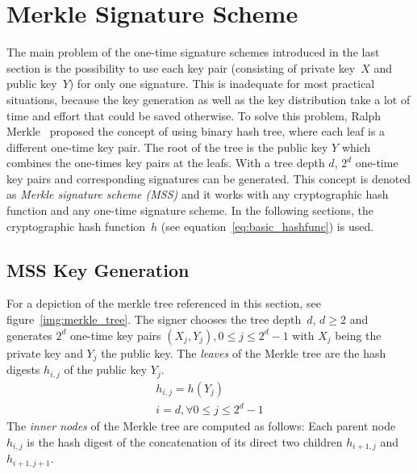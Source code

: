 \section{Merkle Signature Scheme} %
The main problem of the one-time signature schemes introduced in the last section is the possibility to use each key pair (consisting of private key~$X$ and public key~$Y$) for only one signature. This is inadequate for most practical situations, because the key generation as well as the key distribution take a lot of time and effort that could be saved otherwise.
To solve this problem, Ralph Merkle~\cite{cha:bg_merkletrees_Merkle_1979} proposed the concept of using binary hash tree, where each leaf is a different one-time key pair. The root of the tree is the public key $Y$  which combines the one-times key pairs at the leafs. With a tree depth $d$, $2^d$ one-time key pairs and corresponding signatures can be generated. %
This concept is denoted as \textit{Merkle signature scheme (MSS)} and it works with any cryptographic hash function and any one-time signature scheme. In the following sections, the cryptographic hash function~$h$ (see equation~\ref{eq:basic_hashfunc}) is used. 

\subsection{MSS Key Generation}
For a depiction of the merkle tree referenced in this section, see figure~\ref{img:merkle_tree}.
The signer chooses the tree depth~$d$, $d \geq 2$ and generates $2^d$ one-time key pairs $(X_j, Y_j), 0 \leq j \leq 2^d-1$ with $X_j$ being the private key and $Y_j$ the public key. The \textit{leaves} of the Merkle tree are the hash digests $h_{i,j}$ of the public key $Y_j$.
\begin{gather}
\label{eq:leaf_merkle_tree:hash_digest_publ_key_Y}
h_{i,j} = h(Y_j) \\
i = d , \forall 0 \leq j \leq 2^d - 1 \nonumber
\end{gather}
The \textit{inner nodes} of the Merkle tree are computed as follows: Each parent node $h_{i,j}$ is the hash digest of the concatenation of its direct two children $h_{i+1,j}$ and $h_{i+1,j+1}$.

